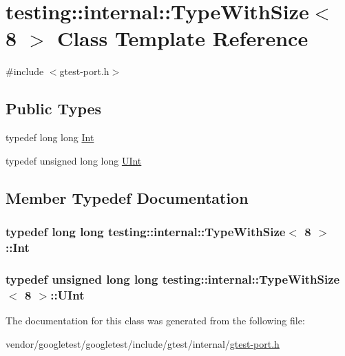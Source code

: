 \hypertarget{classtesting_1_1internal_1_1TypeWithSize_3_018_01_4}{}\section{testing\+:\+:internal\+:\+:Type\+With\+Size$<$ 8 $>$ Class Template Reference}
\label{classtesting_1_1internal_1_1TypeWithSize_3_018_01_4}


{\ttfamily \#include $<$gtest-\/port.\+h$>$}

\subsection*{Public Types}
\begin{DoxyCompactItemize}
\item 
typedef long long \hyperlink{classtesting_1_1internal_1_1TypeWithSize_3_018_01_4_a36d5697e5f5254b0495f13c97d747e36}{Int}
\item 
typedef unsigned long long \hyperlink{classtesting_1_1internal_1_1TypeWithSize_3_018_01_4_a747e21c5aee8faf07ec65cd4c3d1ca62}{U\+Int}
\end{DoxyCompactItemize}


\subsection{Member Typedef Documentation}
\subsubsection[{\texorpdfstring{Int}{Int}}]{\setlength{\rightskip}{0pt plus 5cm}typedef long long {\bf testing\+::internal\+::\+Type\+With\+Size}$<$ 8 $>$\+::{\bf Int}}\hypertarget{classtesting_1_1internal_1_1TypeWithSize_3_018_01_4_a36d5697e5f5254b0495f13c97d747e36}{}\label{classtesting_1_1internal_1_1TypeWithSize_3_018_01_4_a36d5697e5f5254b0495f13c97d747e36}
\subsubsection[{\texorpdfstring{U\+Int}{UInt}}]{\setlength{\rightskip}{0pt plus 5cm}typedef unsigned long long {\bf testing\+::internal\+::\+Type\+With\+Size}$<$ 8 $>$\+::{\bf U\+Int}}\hypertarget{classtesting_1_1internal_1_1TypeWithSize_3_018_01_4_a747e21c5aee8faf07ec65cd4c3d1ca62}{}\label{classtesting_1_1internal_1_1TypeWithSize_3_018_01_4_a747e21c5aee8faf07ec65cd4c3d1ca62}


The documentation for this class was generated from the following file\+:\begin{DoxyCompactItemize}
\item 
vendor/googletest/googletest/include/gtest/internal/\hyperlink{gtest-port_8h}{gtest-\/port.\+h}\end{DoxyCompactItemize}
